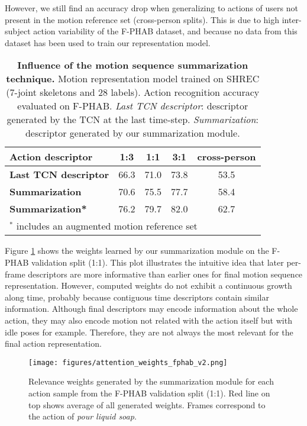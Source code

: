 \documentclass[letterpaper, 10 pt, conference]{ieeeconf}
\begin{document}
However, we still find an accuracy drop when generalizing to actions of users not present in the motion reference set (cross-person splits). This is due to high inter-subject action variability of the F-PHAB dataset, and because no data from this dataset has been used to train our representation model.



\begin{table}[!htb]
\centering
\begin{tabular}{|l|c|c|c|c|}
\hline
\textbf{Action descriptor} & \textbf{1:3} & \textbf{1:1} & \textbf{3:1} & \textbf{cross-person} \\ \hline
\textbf{Last TCN descriptor} & 66.3 & 71.0 & 73.8 & 53.5 \\ \hline
\textbf{Summarization} & 70.6 & 75.5 & 77.7 & 58.4 \\ \hline
\textbf{Summarization*} & 76.2 & 79.7 & 82.0 & 62.7 \\ \hline
\multicolumn{5}{l}{\footnotesize \(^*\) includes an augmented motion reference set} \\
\end{tabular}
\caption{\textbf{Influence of the motion sequence summarization technique.} Motion representation model trained on SHREC (7-joint skeletons and 28 labels). Action recognition accuracy evaluated on F-PHAB. \textit{Last TCN descriptor}: descriptor generated by the TCN at the last time-step. \textit{Summarization}: descriptor generated by our summarization module.} 
\label{tab:summ_comp}
\end{table}



Figure \ref{fig:att_weights} shows the weights learned by our summarization module on the F-PHAB validation split (1:1). 
This plot illustrates the intuitive idea that later per-frame descriptors are more informative than earlier ones for final motion sequence representation.
However, computed weights do not exhibit a continuous growth along time, probably because contiguous time descriptors contain similar information. Although final descriptors may encode information about the whole action, they may also encode motion not related with the action itself but with idle poses for example. Therefore, they are not always the most relevant for the final action representation. 

\begin{figure}[!htb]
    \centering
    \texttt{[image: figures/attention\_weights\_fphab\_v2.png]}
    \caption{Relevance weights generated by the summarization module for each action sample from the F-PHAB validation split (1:1). Red line on top shows average of all generated weights. Frames correspond to the action of \textit{pour liquid soap}.
}    
    \label{fig:att_weights}
\end{figure}
\end{document}

